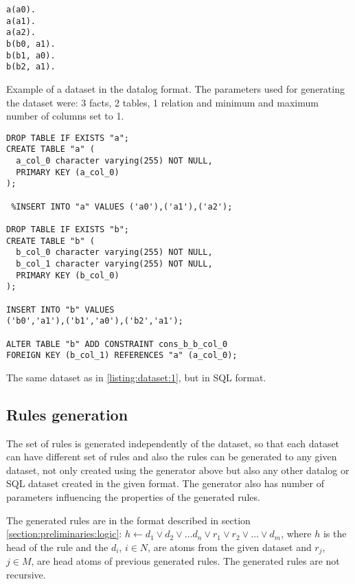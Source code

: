 \documentclass[12pt,oneside]{article}
\begin{document}
\begin{listing}
    \begin{verbatim}
a(a0).
a(a1).
a(a2).
b(b0, a1).
b(b1, a0).
b(b2, a1).
    \end{verbatim}
\caption{Example of a dataset in the datalog format. The parameters used for
generating the dataset
were: 3 facts, 2 tables, 1 relation and minimum and maximum number of columns set to
1.}
\label{listing:dataset:1}
\end{listing}

\begin{listing}
    \begin{verbatim}
DROP TABLE IF EXISTS "a";
CREATE TABLE "a" (
  a_col_0 character varying(255) NOT NULL,
  PRIMARY KEY (a_col_0)
);

 %INSERT INTO "a" VALUES ('a0'),('a1'),('a2');

DROP TABLE IF EXISTS "b";
CREATE TABLE "b" (
  b_col_0 character varying(255) NOT NULL,
  b_col_1 character varying(255) NOT NULL,
  PRIMARY KEY (b_col_0)
);

INSERT INTO "b" VALUES
('b0','a1'),('b1','a0'),('b2','a1');

ALTER TABLE "b" ADD CONSTRAINT cons_b_b_col_0
FOREIGN KEY (b_col_1) REFERENCES "a" (a_col_0);
    \end{verbatim}
\caption{The same dataset as in \ref{listing:dataset:1}, but in SQL format.}
\label{listing:dataset:2}

\end{listing}


\subsection{Rules generation}
The set of rules is generated independently of the dataset, so that each dataset can have different
set of rules and also the rules can be generated to any given dataset, not only created using the
generator above but also any other datalog or SQL dataset created in the given format. The generator
also has number of parameters influencing the properties of the generated rules.

The generated rules are in the
format described in section \ref{section:preliminaries:logic}: $h \leftarrow d_1 \vee d_2 \vee
\dots d_n \vee r_1 \vee r_2 \vee \dots \vee d_m$, where $h$ is the head of the rule and the $d_i$,
$i \in N$, are atoms from the given dataset and $r_j$, $j \in M$, are head atoms of previous
generated rules. The generated rules are not recursive.
\end{document}
